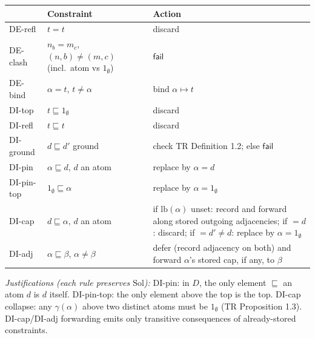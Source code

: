 \documentclass[
  10pt,
  letterpaper,
]{article}
\begin{document}
\begin{longtable}[]{@{}
  >{\raggedright\arraybackslash}p{}
  >{\raggedright\arraybackslash}p{}
  >{\raggedright\arraybackslash}p{}@{}}
\toprule\noalign{}
\begin{minipage}[b]{\linewidth}\raggedright
\end{minipage} & \begin{minipage}[b]{\linewidth}\raggedright
Constraint
\end{minipage} & \begin{minipage}[b]{\linewidth}\raggedright
Action
\end{minipage} \\
\midrule\noalign{}
\endhead
\bottomrule\noalign{}
\endlastfoot
DE-refl & \(t = t\) & discard \\
DE-clash & \(n_b = m_c\), \((n,b)\ne(m,c)\) (incl.~atom vs
\(1_\emptyset\)) & \(\mathsf{fail}\) \\
DE-bind & \(\alpha = t\), \(t \ne \alpha\) & bind
\(\alpha \mapsto t\) \\
DI-top & \(t \sqsubseteq 1_\emptyset\) & discard \\
DI-refl & \(t \sqsubseteq t\) & discard \\
DI-ground & \(d \sqsubseteq d'\) ground & check TR Definition 1.2; else
\(\mathsf{fail}\) \\
DI-pin & \(\alpha \sqsubseteq d\), \(d\) an atom & replace by
\(\alpha = d\) \\
DI-pin-top & \(1_\emptyset \sqsubseteq \alpha\) & replace by
\(\alpha = 1_\emptyset\) \\
DI-cap & \(d \sqsubseteq \alpha\), \(d\) an atom & if
\(\mathrm{lb}(\alpha)\) unset: record and forward along stored outgoing
adjacencies; if \(= d\): discard; if \(= d' \ne d\): replace by
\(\alpha = 1_\emptyset\) \\
DI-adj & \(\alpha \sqsubseteq \beta\), \(\alpha \ne \beta\) & defer
(record adjacency on both) and forward \(\alpha\)'s stored cap, if any,
to \(\beta\) \\
\end{longtable}

\emph{Justifications (each rule preserves \(\mathrm{Sol}\)):} DI-pin: in
\(D\), the only element \(\sqsubseteq\) an atom \(d\) is \(d\) itself.
DI-pin-top: the only element above the top is the top. DI-cap collapse:
any \(\gamma(\alpha)\) above two distinct atoms must be \(1_\emptyset\)
(TR Proposition 1.3). DI-cap/DI-adj forwarding emits only transitive
consequences of already-stored constraints.
\end{document}
